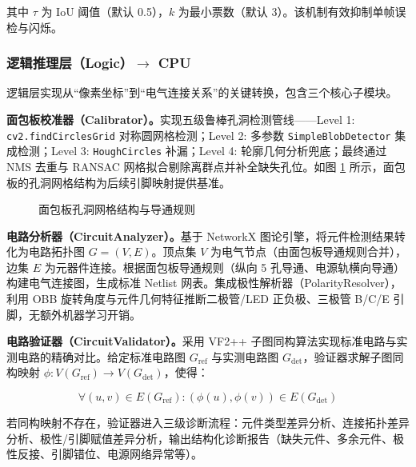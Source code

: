 \documentclass[a4paper,12pt,fontset=ubuntu]{ctexart}
\begin{document}
其中 $\tau$ 为 IoU 阈值（默认 0.5），$k$ 为最小票数（默认 3）。该机制有效抑制单帧误检与闪烁。

\subsubsection{逻辑推理层（Logic）$\rightarrow$ CPU}

逻辑层实现从“像素坐标”到“电气连接关系”的关键转换，包含三个核心子模块。

\textbf{面包板校准器（Calibrator）。}实现五级鲁棒孔洞检测管线——Level 1: \texttt{cv2.findCirclesGrid} 对称圆网格检测；Level 2: 多参数 \texttt{SimpleBlobDetector} 集成检测；Level 3: \texttt{HoughCircles} 补漏；Level 4: 轮廓几何分析兜底；最终通过 NMS 去重与 RANSAC 网格拟合剔除离群点并补全缺失孔位。如图 \ref{fig:breadboard} 所示，面包板的孔洞网格结构为后续引脚映射提供基准。

\begin{figure}[htbp]
    \centering
    \caption{面包板孔洞网格结构与导通规则}
    \label{fig:breadboard}
\end{figure}

\textbf{电路分析器（CircuitAnalyzer）。}基于 NetworkX 图论引擎，将元件检测结果转化为电路拓扑图 $G = (V, E)$。顶点集 $V$ 为电气节点（由面包板导通规则合并），边集 $E$ 为元器件连接。根据面包板导通规则（纵向 5 孔导通、电源轨横向导通）构建电气连接图，生成标准 Netlist 网表。集成极性解析器（PolarityResolver），利用 OBB 旋转角度与元件几何特征推断二极管/LED 正负极、三极管 B/C/E 引脚，无额外机器学习开销。

\textbf{电路验证器（CircuitValidator）。}采用 VF2++ 子图同构算法实现标准电路与实测电路的精确对比。给定标准电路图 $G_{\text{ref}}$ 与实测电路图 $G_{\text{det}}$，验证器求解子图同构映射 $\phi: V(G_{\text{ref}}) \rightarrow V(G_{\text{det}})$，使得：

\begin{equation}
\forall (u, v) \in E(G_{\text{ref}}): (\phi(u), \phi(v)) \in E(G_{\text{det}})
\label{eq:vf2}
\end{equation}

若同构映射不存在，验证器进入三级诊断流程：元件类型差异分析、连接拓扑差异分析、极性/引脚赋值差异分析，输出结构化诊断报告（缺失元件、多余元件、极性反接、引脚错位、电源网络异常等）。
\end{document}
